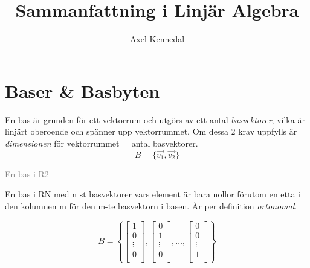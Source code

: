 \documentclass[11pt]{article}
\author{Axel Kennedal} %
\title{Sammanfattning i Linjär Algebra}
\newcommand{\comment}[1]{\begin{center}\textcolor{Gray}{#1} \end{center}}
\begin{document}
\maketitle
\tableofcontents
\newpage

\section{Baser \& Basbyten}
En bas är grunden för ett vektorrum och utgörs av ett antal \emph{basvektorer}, vilka är linjärt oberoende och spänner upp vektorrummet. Om dessa 2 krav uppfylls är \emph{dimensionen} för vektorrummet = antal basvektorer.
\begin{equation}
B = \{\vec{v_{1}}, \vec{v_{2}} \}
\end{equation}
\comment{En bas i R2}
En bas i RN med n st basvektorer vars element är bara nollor förutom en etta i den kolumnen m för den m-te basvektorn i basen.
Är per definition \emph{ortonomal}.

\begin{equation}
B = \left \{
\begin{bmatrix}
1 \\
0 \\
\vdots \\
0 \\
\end{bmatrix}
,
\begin{bmatrix}
0 \\
1 \\
\vdots \\
0 \\
\end{bmatrix}
, \ldots
,
\begin{bmatrix}
0 \\
0 \\
\vdots \\
1 \\
\end{bmatrix}
\right \}
\end{equation}
\end{document}
